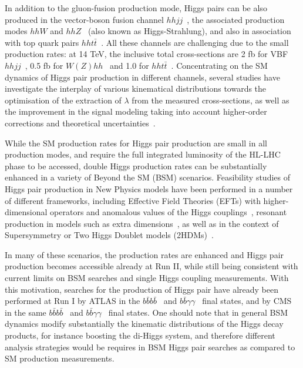 In addition to the gluon-fusion production mode, Higgs pairs
can be also produced in the vector-boson fusion
channel $hhjj$~\cite{Contino:2010mh,Dolan:2013rja,Dolan:2015zja,
  Brooijmans:2014eja},
the associated production modes $hhW$ and $hhZ$~\cite{Barger:1988jk,baglio}
(also known as Higgs-Strahlung),
and also in association
with top quark pairs $hht\bar{t}$~\cite{Englert:2014uqa}.
%
All these channels are challenging due to the small production
rates: at 14 TeV, the inclusive total cross-sections are
2 fb for VBF $hhjj$~\cite{Liu-Sheng:2014gxa},
0.5 fb for $W(Z)hh$~\cite{baglio}
and 1.0 for $hht\bar{t}$~\cite{Englert:2014uqa}.
%
Concentrating on the SM dynamics of Higgs pair production
in different channels, several studies
have investigate the interplay of various kinematical
distributions towards the optimisation of the
extraction of $\lambda$ from the measured
cross-sections, as well as the improvement
in the signal modeling taking into account
higher-order corrections and theoretical
uncertainties~\cite{Slawinska:2014vpa,Chen:2014xra,Goertz:2013kp,
  Frederix:2014hta,Dawson:2015oha,Maltoni:2014eza,Maierhofer:2013sha,Grigo:2013rya,Grigo:2014jma}.
%


While the SM production rates for Higgs
pair production are small in all production modes,
and require the full integrated luminosity of the HL-LHC phase
to be accessed, double Higgs production rates can be substantially
enhanced in a variety of Beyond the SM (BSM) scenarios.
%
Feasibility studies of Higgs pair production in New Physics
models have been performed in a number of different frameworks,
including Effective Field
Theories (EFTs) with higher-dimensional
operators and anomalous values of the
Higgs couplings~\cite{Nishiwaki:2013cma,Dall'Osso:2015aia,Azatov:2015oxa,Liu:2014rba,Goertz:2014qta,He:2015spf,Grober:2015cwa}, resonant production
in models such as extra dimensions~\cite{Gouzevitch:2013qca,Cooper:2013kia,No:2013wsa}, as well as
in the context of Supersymmetry or Two Higgs Doublet models (2HDMs)~\cite{Belyaev:1999kk,Han:2013sga,Hespel:2014sla,Wu:2015nba,Cao:2014kya,Ellwanger:2013ova}.

%
In many of these scenarios, the production rates are enhanced
and Higgs pair production becomes accessible already at
Run II, while still being consistent with current limits on BSM searches
and single Higgs coupling measurements.
%
With this motivation, searches for the production of Higgs pair
have already been performed at Run I
by ATLAS in the $b\bar{b}b\bar{b}$~\cite{Aad:2015uka}
and $b\bar{b}\gamma\gamma$~\cite{Aad:2014yja} final states,
and by
CMS in the same $b\bar{b}b\bar{b}$~\cite{Khachatryan:2015yea}
and $b\bar{b}\gamma\gamma$~\cite{Chatrchyan:2011wt} final
states.
%
One should note that in general BSM dynamics modify substantially
the kinematic distributions of the Higgs decay products, for
instance boosting the di-Higgs system, and therefore
different analysis strategies would be requires in BSM
Higgs pair searches as compared to SM production measurements.

